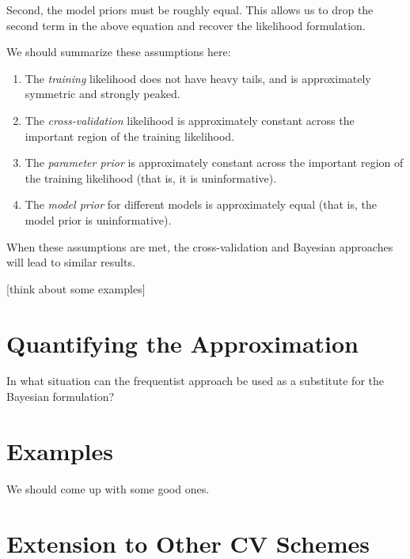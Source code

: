 \documentclass[12pt]{article}
\begin{document}
Second, the model priors must be roughly equal.  This allows us to drop the
second term in the above equation and recover the likelihood formulation.

We should summarize these assumptions here:
\begin{enumerate}
  \item The {\it training} likelihood does not have heavy tails, and is
    approximately symmetric and strongly peaked.
  \item The {\it cross-validation} likelihood is approximately constant
    across the important region of the training likelihood.
  \item The {\it parameter prior} is approximately constant across the important
    region of the training likelihood (that is, it is uninformative).
  \item The {\it model prior} for different models is approximately equal
    (that is, the model prior is uninformative).
\end{enumerate}
When these assumptions are met, the cross-validation and Bayesian approaches
will lead to similar results.

[think about some examples]

\section{Quantifying the Approximation}
In what situation can the frequentist approach be used as a substitute for
the Bayesian formulation?

\section{Examples}
We should come up with some good ones.

\section{Extension to Other CV Schemes}
\end{document}
